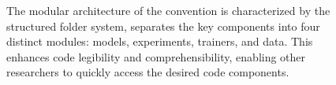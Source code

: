 \begin{figure}
\centering
{}
\caption{The modular architecture of the convention is characterized by the structured folder system, separates the key components into four distinct modules: models, experiments, trainers, and data. This enhances code legibility and comprehensibility, enabling other researchers to quickly access the desired code components.}
\end{figure}










